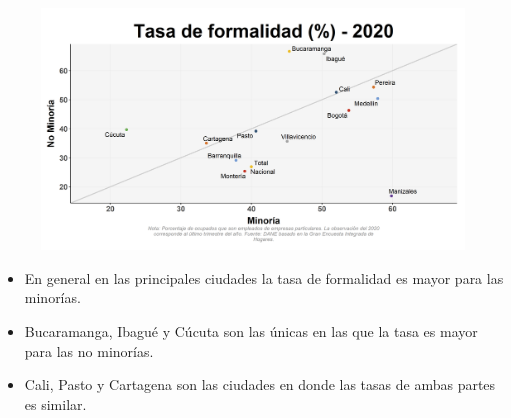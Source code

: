     \begin{figure}[H]
        \caption[Tasa de formalidad por ciudades por minorías y no minorías para 2020 ]{\label{formal_minoria_ciudad_scatter} }
        \begin{center}
        \includegraphics[width=\textwidth,keepaspectratio]{img/var_57_scatter.png}
        \end{center}
    \end{figure}
            \begin{itemize}
                \item En general en las principales ciudades la tasa de formalidad es mayor para las minorías.
                \item Bucaramanga, Ibagué y Cúcuta son las únicas en las que la tasa es mayor para las no minorías.
                \item Cali, Pasto y Cartagena son las ciudades en donde las tasas de ambas partes es similar.
                \end{itemize}

